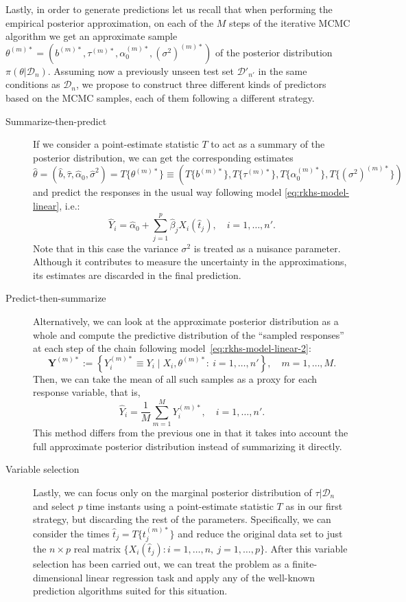 \documentclass[ba]{imsart}
\numberwithin{equation}{section}
\theoremstyle{plain}
\begin{document}
Lastly, in order to generate predictions let us recall that when performing the empirical posterior approximation, on each of the \(M\) steps of the iterative MCMC algorithm we get an approximate sample \(\theta^{(m)*}=(b^{(m)*}, \tau^{(m)*}, \alpha_0^{(m)*}, (\sigma^2)^{(m)*})\) of the posterior distribution \(\pi(\theta| \mathcal D_n)\). Assuming now a previously unseen test set \(\mathcal D'_{n'}\) in the same conditions as \(\mathcal D_n\), we propose to construct three different kinds of predictors based on the MCMC samples, each of them following a different strategy.

\begin{description}
  \item[Summarize-then-predict] If we consider a point-estimate statistic \(T\) to act as a summary of the posterior distribution, we can get the corresponding estimates \(\hat{\theta}=(\hat b, \hat \tau, \hat{\alpha}_0, \hat{\sigma}^2) = T\{\theta^{(m)*}\} \equiv (T\{b^{(m)*}\}, T\{\tau^{(m)*}\}, T\{\alpha_0^{(m)*}\}, T\{(\sigma^2)^{(m)*}\})\) and predict the responses in the usual way following model \eqref{eq:rkhs-model-linear}, i.e.:
  \[
    \hat Y_i = \hat{\alpha}_0 + \sum_{j=1}^p \hat{\beta}_j X_i(\hat{t}_j), \quad i=1,\dots, n'.
  \]
  Note that in this case the variance \(\sigma^2\) is treated as a nuisance parameter. Although it contributes to measure the uncertainty in the approximations, its estimates are discarded in the final prediction.

  \item[Predict-then-summarize] Alternatively, we can  look at the approximate posterior distribution as a whole and compute the predictive distribution of the ``sampled responses'' at each step of the chain following model~\eqref{eq:rkhs-model-linear-2}:
  \begin{equation}\label{eq:sampled-response-vector}
  \bm Y^{(m)*} := \left\{Y_i^{(m)*} \equiv Y_i \mid X_i, \theta^{(m)*}:\ i=1,\dots,n'\right\}, \quad m=1,\dots,M.
  \end{equation}
  Then, we can take the mean of all such samples as a proxy for each response variable, that is,
  \[
  \hat Y_i = \frac{1}{M}\sum_{m=1}^M Y_i^{(m)*}, \quad i=1,\dots,n'.
  \]
  This method differs from the previous one in that it takes into account the full approximate posterior distribution instead of summarizing it directly.

  \item[Variable selection] Lastly, we can focus only on the marginal posterior distribution of \(\tau|\mathcal D_n\) and select \(p\) time instants using a point-estimate statistic \(T\) as in our first strategy, but discarding the rest of the parameters. Specifically, we can consider the times \(\hat t_j = T\{t_j^{(m)*}\}\) and reduce the original data set to just the \(n\times p\) real matrix \(\{X_i(\hat t_j): i=1, \dots,n, \ j=1,\dots,p\}\). After this variable selection has been carried out, we can treat the problem as a finite-dimensional linear regression task and apply any of the well-known prediction algorithms suited for this situation.
\end{description}
\end{document}
